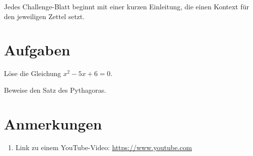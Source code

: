 \documentclass{dcbl/challenge}
\begin{document}
Jedes Challenge-Blatt beginnt mit einer kurzen Einleitung, die einen Kontext für den jeweiligen Zettel setzt. 

\section*{Aufgaben}
\begin{aufgabe}
    Löse die Gleichung $x^2 - 5x + 6 = 0$.
\end{aufgabe}

\begin{aufgabe}
    Beweise den Satz des Pythagoras.
\end{aufgabe}

\section*{Anmerkungen}
\begin{enumerate}
    \item Link zu einem YouTube-Video: \url{https://www.youtube.com}
\end{enumerate}
\end{document}
